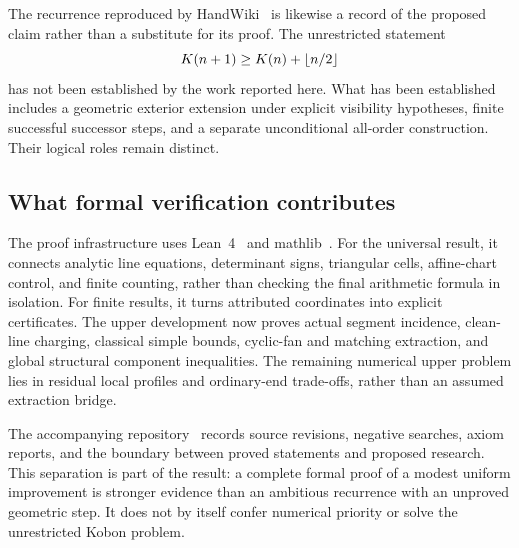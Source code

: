 The recurrence reproduced by HandWiki~\citep{handwiki2026} is likewise a record of the proposed claim rather than a substitute for its proof. The unrestricted statement
\[
 K(n+1)\ge K(n)+\left\lfloor n/2\right\rfloor
\]
has not been established by the work reported here. What has been established includes a geometric exterior extension under explicit visibility hypotheses, finite successful successor steps, and a separate unconditional all-order construction. Their logical roles remain distinct.

\subsection{What formal verification contributes}

The proof infrastructure uses Lean~4~\citep{lean4} and mathlib~\citep{mathlib}. For the universal result, it connects analytic line equations, determinant signs, triangular cells, affine-chart control, and finite counting, rather than checking the final arithmetic formula in isolation. For finite results, it turns attributed coordinates into explicit certificates. The upper development now proves actual segment incidence, clean-line charging, classical simple bounds, cyclic-fan and matching extraction, and global structural component inequalities. The remaining numerical upper problem lies in residual local profiles and ordinary-end trade-offs, rather than an assumed extraction bridge.

The accompanying repository~\citep{zarzueloRepository} records source revisions, negative searches, axiom reports, and the boundary between proved statements and proposed research. This separation is part of the result: a complete formal proof of a modest uniform improvement is stronger evidence than an ambitious recurrence with an unproved geometric step. It does not by itself confer numerical priority or solve the unrestricted Kobon problem.
